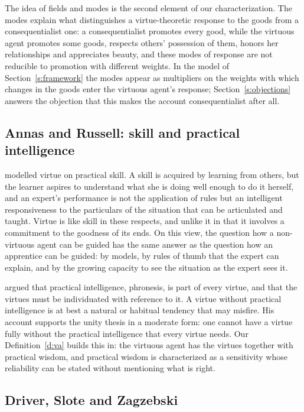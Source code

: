 \documentclass{situationist-preprint}
\begin{document}
The idea of fields and modes is the second element of our characterization. The modes explain what distinguishes a virtue-theoretic response to the goods from a consequentialist one: a consequentialist promotes every good, while the virtuous agent promotes some goods, respects others' possession of them, honors her relationships and appreciates beauty, and these modes of response are not reducible to promotion with different weights. In the model of Section~\ref{s:framework} the modes appear as multipliers on the weights with which changes in the goods enter the virtuous agent's response; Section~\ref{s:objections} answers the objection that this makes the account consequentialist after all.

\subsection{Annas and Russell: skill and practical intelligence}

\citet{Annas2011} modelled virtue on practical skill. A skill is acquired by learning from others, but the learner aspires to understand what she is doing well enough to do it herself, and an expert's performance is not the application of rules but an intelligent responsiveness to the particulars of the situation that can be articulated and taught. Virtue is like skill in these respects, and unlike it in that it involves a commitment to the goodness of its ends. On this view, the question how a non-virtuous agent can be guided has the same answer as the question how an apprentice can be guided: by models, by rules of thumb that the expert can explain, and by the growing capacity to see the situation as the expert sees it.

\citet{Russell2009} argued that practical intelligence, phronesis, is part of every virtue, and that the virtues must be individuated with reference to it. A virtue without practical intelligence is at best a natural or habitual tendency that may misfire. His account supports the unity thesis in a moderate form: one cannot have a virtue fully without the practical intelligence that every virtue needs. Our Definition~\ref{d:va} builds this in: the virtuous agent has the virtues together with practical wisdom, and practical wisdom is characterized as a sensitivity whose reliability can be stated without mentioning what is right.

\subsection{Driver, Slote and Zagzebski}
\end{document}
